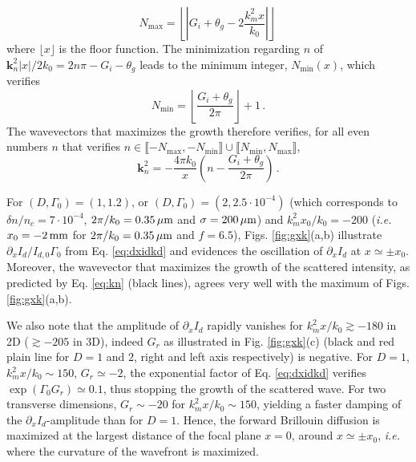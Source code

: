 \documentclass[
 reprint,
 amsmath,amssymb,
 aps,
]{revtex4-1}
\begin{document}
\begin{equation}\label{eq:nmax}
    N_\mathrm{max} =\left\lfloor \left\vert  G_i +\theta_g-2\frac{k_m^2  x   }{k_0}  \right\vert \right\rfloor \,  
\end{equation}
where $\lfloor x  \rfloor$ is the floor function.
The minimization regarding $n$ of  $\mathbf{k}_n^2 \vert x\vert  /2k_0 = 2n\pi-G_i- \theta_g$ leads to  the minimum integer, $N_\mathrm{min}(x)$, which verifies
\begin{equation}\label{eq:nmin}
    N_\mathrm{min} =  \left\lfloor\frac{ G_i+ \theta_g}{2\pi}\right\rfloor+1\, .
\end{equation}
The wavevectors that maximizes the growth therefore verifies,
for all even numbers $n$ that verifies $n\in  \llbracket -N_\mathrm{max} ,-N_\mathrm{min} \rrbracket   \cup \llbracket N_\mathrm{min} ,N_\mathrm{max} \rrbracket$, 
\begin{equation}\label{eq:kn}
    \mathbf{k}_n^2 =-\frac{4\pi k_0}{x} \left(n- \frac{  G_i +\theta_g}{2\pi}   \right) \, .
\end{equation}

For $(D,\Gamma_0)=(1,1.2)$,   or $(D,\Gamma_0)=(2,2.5\cdot 10^{-4} )$ (which corresponds to $\delta n/n_c =7\cdot 10^{-4}$, $2\pi/k_0=0.35\,\rm\mu m$ and $\sigma=200\,\rm\mu m$) and $k_m^2x_0/k_0= -200$ (\emph{i.e.} $x_0=-2 \,\rm mm$ for $2\pi/k_0=0.35\,\rm\mu m$ and $f=6.5$), Figs. \ref{fig:gxk}(a,b) illustrate $\partial_x I_d / I_{d,0} \Gamma_0$ from Eq. \eqref{eq:dxidkd} and evidences the oscillation of $\partial_x I_d$ at $x\simeq \pm x_0$. Moreover, the wavevector that maximizes the growth of the scattered intensity, as predicted by Eq. \eqref{eq:kn} (black lines), agrees very well with the maximum of Figs. \ref{fig:gxk}(a,b). 

We also note that the amplitude of $\partial_x I_d$ rapidly vanishes for $k_m^2 x/k_0\gtrsim -180$ in 2D ($\gtrsim -205$ in 3D), indeed $G_r$  as illustrated in  Fig. \ref{fig:gxk}(c) (black and red plain line for $D=1$ and $2$,  right and left axis respectively) is negative. For $D=1$,  $k_m^2 x/k_0\sim 150$, $G_r\simeq -2$,  the exponential factor of Eq. \eqref{eq:dxidkd} verifies $\exp(\Gamma_0G_r) \simeq 0.1$, thus stopping the growth of the scattered wave.  For two transverse dimensions, $G_r\sim -20 $ for $k_m^2 x/k_0\sim 150$, yielding a faster damping of the $\partial_x I_d$-amplitude than for $D=1$.
Hence, the forward Brillouin diffusion is maximized at the largest distance  of the focal plane $x=0$, around $x\simeq \pm x_0$, \emph{i.e.}  where the curvature of the wavefront is maximized.
\end{document}

